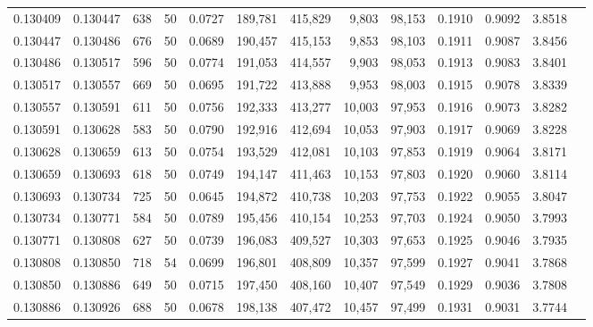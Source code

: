 \begin{tabular}{rrrrrrrrrrrrr}
0.130409 & 0.130447 &   638 &  50 &                                     0.0727 & 189,781 & 415,829 &   9,803 &  98,153 & 0.1910 & 0.9092 & 3.8518 \\
0.130447 & 0.130486 &   676 &  50 &                                     0.0689 & 190,457 & 415,153 &   9,853 &  98,103 & 0.1911 & 0.9087 & 3.8456 \\
0.130486 & 0.130517 &   596 &  50 &                                     0.0774 & 191,053 & 414,557 &   9,903 &  98,053 & 0.1913 & 0.9083 & 3.8401 \\
0.130517 & 0.130557 &   669 &  50 &                                     0.0695 & 191,722 & 413,888 &   9,953 &  98,003 & 0.1915 & 0.9078 & 3.8339 \\
0.130557 & 0.130591 &   611 &  50 &                                     0.0756 & 192,333 & 413,277 &  10,003 &  97,953 & 0.1916 & 0.9073 & 3.8282 \\
0.130591 & 0.130628 &   583 &  50 &                                     0.0790 & 192,916 & 412,694 &  10,053 &  97,903 & 0.1917 & 0.9069 & 3.8228 \\
0.130628 & 0.130659 &   613 &  50 &                                     0.0754 & 193,529 & 412,081 &  10,103 &  97,853 & 0.1919 & 0.9064 & 3.8171 \\
0.130659 & 0.130693 &   618 &  50 &                                     0.0749 & 194,147 & 411,463 &  10,153 &  97,803 & 0.1920 & 0.9060 & 3.8114 \\
0.130693 & 0.130734 &   725 &  50 &                                     0.0645 & 194,872 & 410,738 &  10,203 &  97,753 & 0.1922 & 0.9055 & 3.8047 \\
0.130734 & 0.130771 &   584 &  50 &                                     0.0789 & 195,456 & 410,154 &  10,253 &  97,703 & 0.1924 & 0.9050 & 3.7993 \\
0.130771 & 0.130808 &   627 &  50 &                                     0.0739 & 196,083 & 409,527 &  10,303 &  97,653 & 0.1925 & 0.9046 & 3.7935 \\
0.130808 & 0.130850 &   718 &  54 &                                     0.0699 & 196,801 & 408,809 &  10,357 &  97,599 & 0.1927 & 0.9041 & 3.7868 \\
0.130850 & 0.130886 &   649 &  50 &                                     0.0715 & 197,450 & 408,160 &  10,407 &  97,549 & 0.1929 & 0.9036 & 3.7808 \\
0.130886 & 0.130926 &   688 &  50 &                                     0.0678 & 198,138 & 407,472 &  10,457 &  97,499 & 0.1931 & 0.9031 & 3.7744 \\

\end{tabular}
